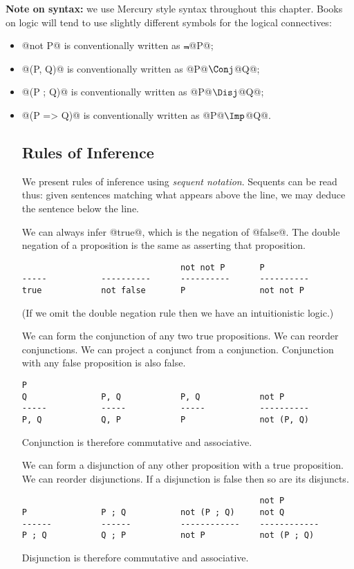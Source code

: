 \textbf{Note on syntax:} we use Mercury style syntax throughout this
chapter.  Books on logic will tend to use slightly different symbols for
the logical connectives:
\begin{itemize}
\item @not P@ is conventionally written as $\Not$@P@;
\item @(P, Q)@ is conventionally written as @P@$\Conj$@Q@;
\item @(P ; Q)@ is conventionally written as @P@$\Disj$@Q@;
\item @(P => Q)@ is conventionally written as @P@$\Imp$@Q@.

\subsection{Rules of Inference}

We present rules of inference using \emph{sequent notation}.  Sequents
can be read thus: given sentences matching what appears above the line,
we may deduce the sentence below the line.

We can always infer @true@, which is the negation of @false@.
The double negation of a proposition is the same as asserting that
proposition.
\begin{verbatim}
                                not not P       P
-----           ----------      ----------      ----------
true            not false       P               not not P
\end{verbatim}
(If we omit the double negation rule then we have an intuitionistic
logic.)

We can form the conjunction of any two true propositions.
We can reorder conjunctions.
We can project a conjunct from a conjunction.
Conjunction with any false proposition is also false.
\begin{verbatim}
P
Q               P, Q            P, Q            not P
-----           -----           -----           ----------
P, Q            Q, P            P               not (P, Q)
\end{verbatim}
Conjunction is therefore commutative and associative.

We can form a disjunction of any other proposition with a true
proposition.
We can reorder disjunctions.
If a disjunction is false then so are its disjuncts.
\begin{verbatim}
                                                not P
P               P ; Q           not (P ; Q)     not Q
------          ------          ------------    ------------
P ; Q           Q ; P           not P           not (P ; Q)
\end{verbatim}
Disjunction is therefore commutative and associative.


\end{itemize}
